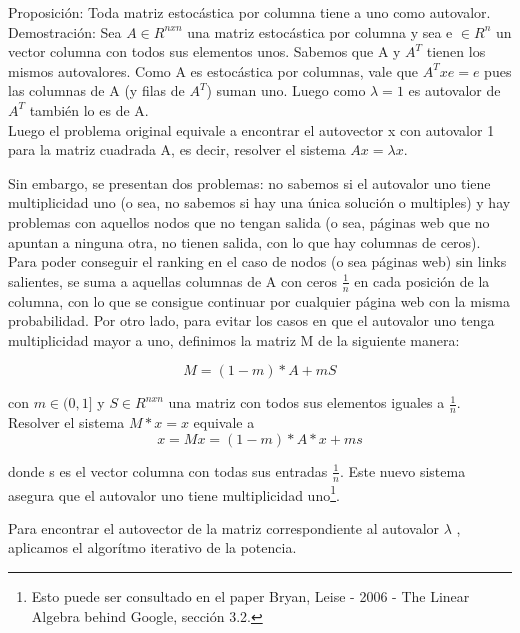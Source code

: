 Proposición: Toda matriz estocástica por columna tiene a uno como autovalor.\\
Demostración: Sea $A \in R^{nxn}$ una matriz estocástica por columna y sea e $\in R^{n}$ un vector columna con todos sus elementos unos. Sabemos que A y $A^{T}$ tienen los mismos autovalores.
Como A es estocástica por columnas, vale que $A^{T} x e = e$ pues las columnas de A (y filas de $A^{T}$) suman uno. Luego como $\lambda = 1$ es autovalor de $A^{T}$ también lo es de A. \\

Luego el problema original equivale a encontrar el autovector x con autovalor 1 para la matriz cuadrada A, es decir, resolver el sistema $Ax = \lambda x$.

Sin embargo, se presentan dos problemas: no sabemos si el autovalor uno tiene multiplicidad uno (o sea, no sabemos si hay una única solución o multiples) y hay problemas con aquellos nodos que no tengan salida (o sea, páginas web que no apuntan a ninguna otra, no tienen salida, con lo que hay columnas de ceros).\\


Para poder conseguir el ranking en el caso de nodos (o sea páginas web) sin links salientes, se suma a aquellas columnas de A con ceros $\frac{1}{n}$ en cada posición de la columna, con lo que se consigue continuar por cualquier página web con la misma probabilidad.
Por otro lado, para evitar los casos en que el autovalor uno tenga multiplicidad mayor a uno, definimos la matriz M de la siguiente manera:

  $$M = (1-m)* A + mS$$

con $m \in (0,1]$ y $S \in R^{nxn}$ una matriz con todos sus elementos iguales a $\frac{1}{n}$.\\
Resolver el sistema $M * x = x$ equivale a 
$$x = M x = (1-m)*A * x+ ms $$

donde s es el vector columna con todas sus entradas $\frac{1}{n}$. Este nuevo sistema asegura que el autovalor uno tiene multiplicidad uno\footnote{Esto puede ser consultado en el paper Bryan, Leise - 2006 - The Linear Algebra behind Google, sección 3.2.}.


Para encontrar el autovector de la matriz correspondiente al autovalor $\lambda$ , aplicamos el algorítmo iterativo de la potencia.\\



